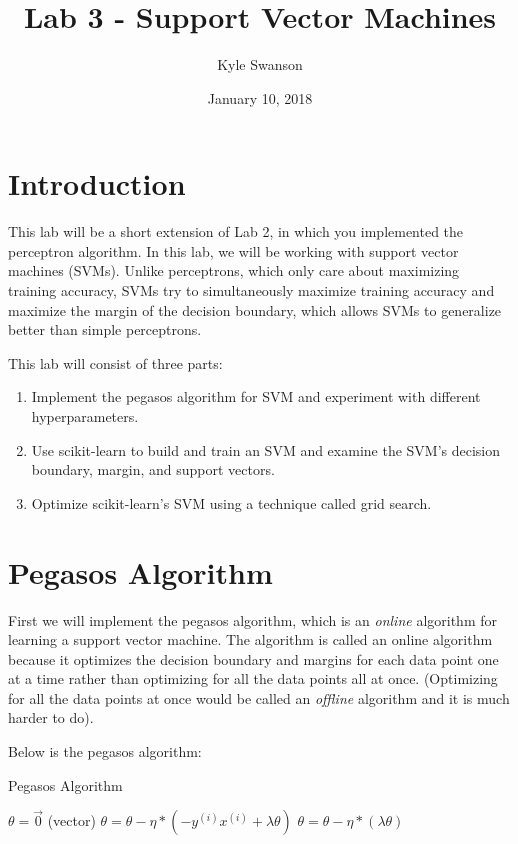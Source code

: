 \documentclass{article}
\title{Lab 3 - Support Vector Machines}
\author{Kyle Swanson}
\date{January 10, 2018}
\begin{document}
\maketitle

\section{Introduction}

This lab will be a short extension of Lab 2, in which you implemented the perceptron algorithm. In this lab, we will be working with support vector machines (SVMs). Unlike perceptrons, which only care about maximizing training accuracy, SVMs try to simultaneously maximize training accuracy and maximize the margin of the decision boundary, which allows SVMs to generalize better than simple perceptrons.

This lab will consist of three parts:

\begin{enumerate}
    \item Implement the pegasos algorithm for SVM and experiment with different hyperparameters.
    
    \item Use scikit-learn to build and train an SVM and examine the SVM's decision boundary, margin, and support vectors.
    
    \item Optimize scikit-learn's SVM using a technique called grid search.
\end{enumerate}

\section{Pegasos Algorithm}

First we will implement the pegasos algorithm, which is an \textit{online} algorithm for learning a support vector machine. The algorithm is called an online algorithm because it optimizes the decision boundary and margins for each data point one at a time rather than optimizing for all the data points all at once. (Optimizing for all the data points at once would be called an \textit{offline} algorithm and it is much harder to do).

Below is the pegasos algorithm:

\begin{algorithm}[H]
    \caption{Pegasos Algorithm}
    \label{perceptron}
    
    \begin{algorithmic}[1]
        \State $\theta = \vec{0}$ (vector)
                \State $\theta = \theta - \eta * (-y^{(i)} x^{(i)} + \lambda \theta)$
                \Else
                    \State $\theta = \theta - \eta * (\lambda \theta)$
                \EndIf
            \EndFor
        \EndFor
        \State \Return{$\theta$}
        \EndProcedure
    \end{algorithmic}
\end{algorithm}
\end{document}
